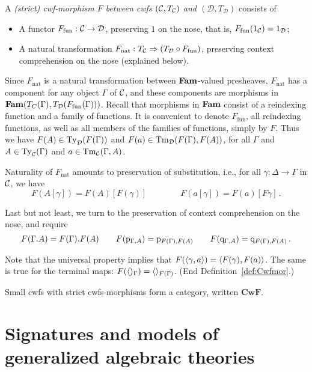 \documentclass{lmcs}
\def\D{\mathcal{D}}
\def\Cwf{\mathbf{CwF}}
\def\nt{\mathrm{nat}}
\def\fun{\mathrm{fun}}
\begin{document}
\begin{definition}\label{def:Cwfmor}
A \emph{(strict) cwf-morphism $F$ between cwfs $({\mathcal C},T_{\mathcal C})$ and $(\D,T_\D)$}
consists of

\begin{itemize}

\item A functor $F_\fun : \C \to \D$, preserving $1$ on the nose,
that is, $F_\fun(1_{\C}) = 1_{\D}$;

\item A natural transformation $F_\nt : T_\C \Rightarrow (T_\D \circ F_\fun)$,
preserving context comprehension on the nose (explained below).

\end{itemize}

Since $F_\nt$ is a natural transformation between $\textbf{Fam}$-valued presheaves,
$F_\nt$ has a component for any object $\Gamma$ of ${\mathcal C}$, and
these components are morphisms in $\Fam(T_C(\Gamma),T_\D(F_\fun(\Gamma)))$.
Recall that morphisms in $\textbf{Fam}$ consist of a reindexing function
and a family of functions. It is convenient to denote $F_\fun$,
all reindexing functions, as well as all members of the families of functions,
simply by $F$. Thus we have $F(A) \in \Ty_\D(F(\Gamma))$
and $F(a) \in \Tm_\D(F(\Gamma), F(A))$, for all $\Gamma$
and $A\in\mathrm{Ty}_{\mathcal C}(\Gamma)$ and $a\in \mathrm{Tm}_{\mathcal C}(\Gamma, A)$.

Naturality of $F_\nt$
amounts to preservation of substitution, {i.e.}, for all
$\gamma : \Delta \to \Gamma$ in ${\mathcal C}$, we have
\[
F(A[\gamma]) = F(A)[F(\gamma)] \qquad \qquad
F(a[\gamma]) = F(a)[F\gamma]\,.
\]

Last but not least, we turn to the preservation of context comprehension
on the nose, and require
\[
F(\Gamma. A) = F(\Gamma). F(A) \qquad
F(\mathrm{p}_{\Gamma, A}) = \mathrm{p}_{F(\Gamma), F(A)} \qquad
F(\mathrm{q}_{\Gamma, A}) = \mathrm{q}_{F(\Gamma), F(A)}\,.
\]

Note that the universal property implies that
$F(\langle \gamma,a \rangle) = \langle F(\gamma),F(a) \rangle$.
The same is true for the terminal maps:
$F(\langle  \rangle_\Gamma) = \langle  \rangle_{F(\Gamma)}$.
(End Definition~\ref{def:Cwfmor}.)
\end{definition}

Small cwfs with strict cwfs-morphisms form a category, written $\Cwf$.

\section{Signatures and models of generalized algebraic theories}\label{gat-sig-mod}
\end{document}
